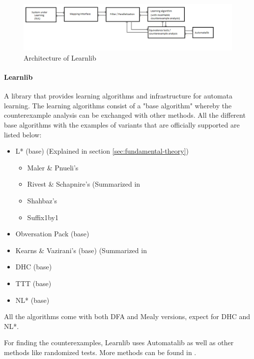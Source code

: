 \documentclass[multi,crop=false,class=article]{standalone}
\begin{document}
\begin{figure}[!ht]
	\includegraphics[width=\textwidth]{Tool_images/learnlib_architecture.png}
	\caption{Architecture of Learnlib}
	\label{fig:learnlib_arch}
\end{figure}

\paragraph{Learnlib} A library that provides learning algorithms and
infrastructure for automata learning. The learning algorithms consist of a "base
algorithm" whereby the counterexample analysis can be exchanged with other
methods. All the different base algorithms with the examples of variants that
are officially supported are listed below:

\begin{itemize}
	\item L* (base) (Explained in section \ref{sec:fundamental-theory})
	\begin{itemize}
		\item Maler \& Pnueli's \cite{Maler1995}
		\item Rivest \& Schapnire's (Summarized in
		\item Shahbaz's \cite{Shahbaz2009}
		\item Suffix1by1 \cite{Irfan2010}
	\end{itemize}
	\item Obversation Pack (base) \cite{Howar2012a}
	\item Kearns \& Vazirani's (base) (Summarized in
	\item DHC (base) \cite{Merten2012}
	\item TTT (base) %
	\item NL* (base) \cite{Bollig2009}
\end{itemize}

All the algorithms come with both DFA and Mealy versions, expect for DHC and
NL*.

For finding the counterexamples, Learnlib uses Automatalib as well as other
methods like randomized tests. More methods can be found in \cite{Isberner2015b}.
\end{document}
